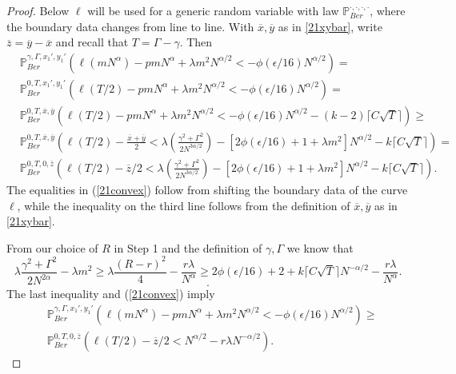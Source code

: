 \begin{proof}
	Below $\ell$ will be used for a generic random variable with law $\mathbb{P}^{\cdot,\cdot,\cdot,\cdot}_{Ber}$, where the boundary data changes from line to line. With $\overline{x},\overline{y}$ as in \eqref{21xybar}, write $\overline{z} = \overline{y}-\overline{x}$ and recall that $T = \Gamma - \gamma$. Then
	\begin{equation} \label{21convex}
		\begin{split}
			& \mathbb{P}^{\gamma, \Gamma,x_1',y_1'}_{Ber} \left(\ell\left(mN^{\alpha}\right) - pm N^\alpha  + \lambda m^2 N^{\alpha/2} < -\phi(\epsilon/16)N^{\alpha/2}  \right) = \\
			& \mathbb{P}^{0,T,x_1',y_1'}_{Ber} \left(\ell(T/2) - pm N^\alpha  + \lambda m^2 N^{\alpha/2} < -\phi(\epsilon/16)N^{\alpha/2}\right) =\\
			& \mathbb{P}^{0,T,\overline{x},\overline{y}}_{Ber}\left(\ell(T/2) - pm N^\alpha  + \lambda m^2 N^{\alpha/2} < -\phi(\epsilon/16)N^{\alpha/2} - (k-2)\lceil C\sqrt{T}\rceil\right) \geq\\
			& \mathbb{P}^{0,T,\overline{x},\overline{y}}_{Ber}\left(\ell(T/2)   - \frac{\overline{x} + \overline{y}}{2}  <  \lambda \left(\frac{\gamma^2 + \Gamma^2}{2 N^{3\alpha/2}} \right)-[2\phi(\epsilon/16) + 1 +  \lambda m^2]N^{\alpha/2} - k \lceil C\sqrt{T} \rceil\right) = \\
			&\mathbb{P}^{0,T,0,\overline{z}}_{Ber}\left(\ell(T/2) - \overline{z}/2 < \lambda \left(\frac{\gamma^2 + \Gamma^2}{2 N^{3\alpha/2}} \right)-[2\phi(\epsilon/16) + 1 +  \lambda m^2]N^{\alpha/2} - k \lceil C\sqrt{T} \rceil\right).
		\end{split}
	\end{equation}
	The equalities in (\ref{21convex}) follow from shifting the boundary data of the curve $\ell$, while the inequality on the third line follows from the definition of $\overline{x},\overline{y}$ as in \eqref{21xybar}.
	
	From our choice of $R$ in Step 1 and the definition of $\gamma, \Gamma$ we know that 
	$$\lambda \frac{\gamma^2+\Gamma^2}{2N^{2\alpha}} -  \lambda m^2 \geq \lambda \frac{(R-r)^2}{4} - \frac{r\lambda}{N^{\alpha}} \geq 2\phi(\epsilon/16) + 2 + k \lceil C\sqrt{T} \rceil N^{-\alpha/2}- \frac{r\lambda}{N^{\alpha}} .$$
	$$ .$$
	The last inequality and (\ref{21convex}) imply 
	\begin{equation} \label{22convex}
		\begin{split}
			& \mathbb{P}^{\gamma, \Gamma,x_1',y_1'}_{Ber} \left(\ell\left(mN^{\alpha}\right) - pm N^\alpha  + \lambda m^2 N^{\alpha/2} < -\phi(\epsilon/16)N^{\alpha/2}  \right) \geq \\
			&\mathbb{P}^{0,T,0,\overline{z}}_{Ber}\left(\ell(T/2) - \overline{z}/2 < N^{\alpha/2} -  r\lambda N^{-\alpha/2} \right).
		\end{split}
	\end{equation}
	

\end{proof}
